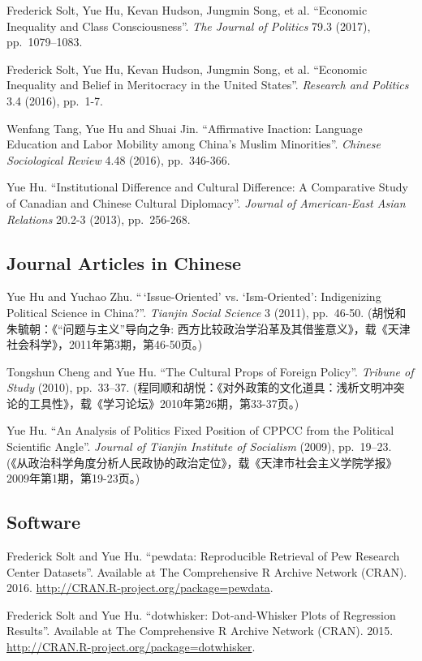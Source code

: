 \documentclass[10.5pt,]{article}
\begin{document}
Frederick Solt, Yue Hu, Kevan Hudson, Jungmin Song, et al. ``Economic
Inequality and Class Consciousness''. \emph{The Journal of Politics}
79.3 (2017), pp.~1079--1083.

Frederick Solt, Yue Hu, Kevan Hudson, Jungmin Song, et al. ``Economic
Inequality and Belief in Meritocracy in the United States''.
\emph{Research and Politics} 3.4 (2016), pp.~1-7.

Wenfang Tang, Yue Hu and Shuai Jin. ``Affirmative Inaction: Language
Education and Labor Mobility among China's Muslim Minorities''.
\emph{Chinese Sociological Review} 4.48 (2016), pp.~346-366.

Yue Hu. ``Institutional Difference and Cultural Difference: A
Comparative Study of Canadian and Chinese Cultural Diplomacy''.
\emph{Journal of American-East Asian Relations} 20.2-3 (2013),
pp.~256-268.

\subsection{Journal Articles in
Chinese}\label{journal-articles-in-chinese}

Yue Hu and Yuchao Zhu. ``\,`Issue-Oriented' vs. `Ism-Oriented':
Indigenizing Political Science in China?''. \emph{Tianjin Social
Science} 3 (2011), pp.~46-50. (胡悦和朱毓朝：《``问题与主义''导向之争:
西方比较政治学沿革及其借鉴意义》，载《天津社会科学》，2011年第3期，第46-50页。)

Tongshun Cheng and Yue Hu. ``The Cultural Props of Foreign Policy''.
\emph{Tribune of Study} (2010), pp.~33--37.
(程同顺和胡悦：《对外政策的文化道具：浅析文明冲突论的工具性》，载《学习论坛》2010年第26期，第33-37页。)

Yue Hu. ``An Analysis of Politics Fixed Position of CPPCC from the
Political Scientific Angle''. \emph{Journal of Tianjin Institute of
Socialism} (2009), pp.~19--23.
(《从政治科学角度分析人民政协的政治定位》，载《天津市社会主义学院学报》
2009年第1期，第19-23页。)

\subsection{Software}\label{software}

Frederick Solt and Yue Hu. ``pewdata: Reproducible Retrieval of Pew
Research Center Datasets''. Available at The Comprehensive R Archive
Network (CRAN). 2016. \url{http://CRAN.R-project.org/package=pewdata}.

Frederick Solt and Yue Hu. ``dotwhisker: Dot-and-Whisker Plots of
Regression Results''. Available at The Comprehensive R Archive Network
(CRAN). 2015. \url{http://CRAN.R-project.org/package=dotwhisker}.
\end{document}
